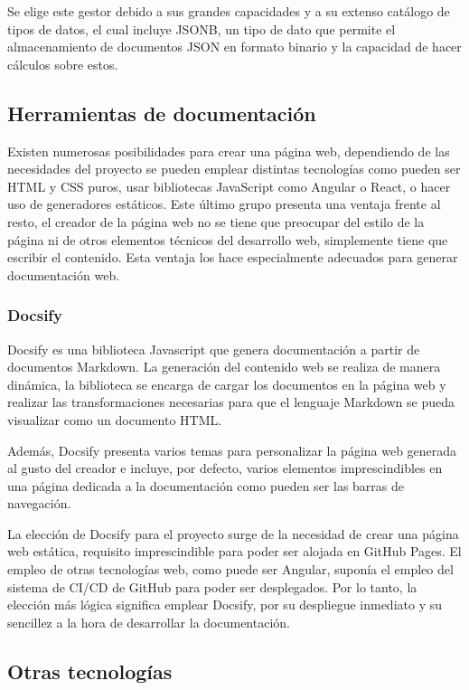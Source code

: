 Se elige este gestor debido a sus grandes capacidades y a su extenso catálogo de tipos de datos, el cual incluye JSONB, un tipo de dato que permite el almacenamiento de documentos JSON en formato binario y la capacidad de hacer cálculos sobre estos.

\subsection{Herramientas de documentación}

Existen numerosas posibilidades para crear una página web, dependiendo de las necesidades del proyecto se pueden emplear distintas tecnologías como pueden ser HTML y CSS puros, usar bibliotecas JavaScript como Angular o React, o hacer uso de generadores estáticos. Este último grupo presenta una ventaja frente al resto, el creador de la página web no se tiene que preocupar del estilo de la página ni de otros elementos técnicos del desarrollo web, simplemente tiene que escribir el contenido. Esta ventaja los hace especialmente adecuados para generar documentación web.

\subsubsection{Docsify}

Docsify \cite{docsify} es una biblioteca Javascript que genera documentación a partir de documentos Markdown. La generación del contenido web se realiza de manera dinámica, la biblioteca se encarga de cargar los documentos en la página web y realizar las transformaciones necesarias para que el lenguaje Markdown se pueda visualizar como un documento HTML.

Además, Docsify presenta varios temas para personalizar la página web generada al gusto del creador e incluye, por defecto, varios elementos imprescindibles en una página dedicada a la documentación como pueden ser las barras de navegación.

La elección de Docsify para el proyecto surge de la necesidad de crear una página web estática, requisito imprescindible para poder ser alojada en GitHub Pages. El empleo de otras tecnologías web, como puede ser Angular, suponía el empleo del sistema de CI/CD de GitHub para poder ser desplegados. Por lo tanto, la elección más lógica significa emplear Docsify, por su despliegue inmediato y su sencillez a la hora de desarrollar la documentación. 

\subsection{Otras tecnologías}

